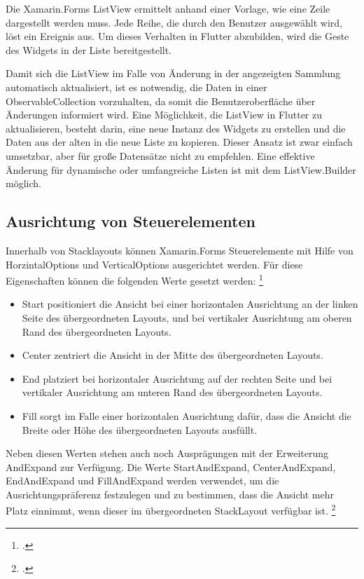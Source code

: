 Die Xamarin.Forms \glq ListView \grq{}ermittelt anhand einer Vorlage,  wie eine Zeile dargestellt werden muss.  Jede Reihe,  die durch den Benutzer ausgewählt wird,  löst ein Ereignis aus.  Um dieses Verhalten in Flutter abzubilden,  wird die Geste des Widgets in der Liste bereitgestellt.  

Damit sich die ListView im Falle von Änderung in der angezeigten Sammlung automatisch aktualisiert, ist es notwendig,  die Daten in einer \glq ObservableCollection\grq{} vorzuhalten,  da somit die Benutzeroberfläche über Änderungen informiert wird.   Eine  Möglichkeit, die  \glq ListView\grq{} in Flutter zu aktualisieren, besteht darin, eine neue Instanz des Widgets zu erstellen und die Daten aus der alten in die neue Liste zu kopieren.  Dieser Ansatz ist zwar einfach umsetzbar, aber für große Datensätze nicht zu empfehlen.  Eine effektive Änderung für dynamische oder umfangreiche Listen ist mit dem ListView.Builder möglich.   

\subsection{Ausrichtung von Steuerelementen}
Innerhalb von \glq Stacklayouts\grq{} können Xamarin.Forms Steuerelemente mit Hilfe von \glq HorzintalOptions\grq{} und \glq VerticalOptions\grq{}  ausgerichtet werden.  Für diese Eigenschaften können die folgenden Werte gesetzt werden: \footcite[Vgl.][Abgerufen am \today]{MicrosoftLayouts2020} 

\begin{itemize}
\setlength\itemsep{-0.6em}
 \item \glq Start\grq{} positioniert die Ansicht bei einer horizontalen Ausrichtung an der linken Seite des übergeordneten Layouts, und bei vertikaler Ausrichtung am oberen Rand des übergeordneten Layouts.
  \item \glq Center\grq{} zentriert die Ansicht in der Mitte des übergeordneten Layouts.
  \item \glq End\grq{} platziert bei horizontaler Ausrichtung auf der rechten Seite und bei vertikaler Ausrichtung  am unteren Rand des übergeordneten Layouts.
  \item \glq Fill\grq{} sorgt im Falle einer horizontalen Ausrichtung dafür, dass die Ansicht die Breite oder Höhe des übergeordneten Layouts ausfüllt.
\end{itemize}
Neben diesen Werten stehen auch noch Ausprägungen mit der Erweiterung \glq AndExpand\grq{} zur Verfügung.  Die Werte \glq StartAndExpand\grq , \glq CenterAndExpand\grq , \glq EndAndExpand\grq{} und \glq FillAndExpand\grq{} werden verwendet, um die Ausrichtungspräferenz festzulegen und zu bestimmen, dass die Ansicht mehr Platz einnimmt, wenn dieser im übergeordneten \glq StackLayout\grq{} verfügbar ist. \footcite[Vgl.][Abgerufen am \today]{MicrosoftLayouts2020} 

